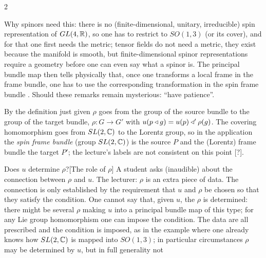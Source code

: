 \begin{paracol}{2}
\begin{application}
Why spinors need this: there is no (finite-dimensional, unitary, irreducible) spin representation of $GL(4,\mathbb{R})$, so one has to restrict to $SO(1,3)$ (or its cover), and for that one first needs the metric; tensor fields do not need a metric, they exist because the manifold is smooth, but finite-dimensional spinor representations require a geometry before one can even say what a spinor is. The principal bundle map then tells physically that, once one transforms a local frame in the frame bundle, one has to use the corresponding transformation in the spin frame bundle     . Should these remarks remain mysterious: ``have patience''.
\end{application}
\begin{coursenote}
By the definition just given $\rho$ goes from the group of the source bundle to the group of the target bundle, $\rho\colon G\to G'$ with $u(p\mathbin{\triangleleft} g)=u(p)\mathbin{\triangleleft}'\rho(g)$. The covering homomorphism goes from $SL(2,\mathbb{C})$ to the Lorentz group, so in the application the \emph{spin frame bundle} (group $SL(2,\mathbb{C})$) is the source $P$ and the (Lorentz) frame bundle the target $P'$; the lecture's labels are not consistent on this point [?]. 
\end{coursenote}
\begin{answer}{Does $u$ determine $\rho$?}[The role of $\rho$]
A student asks (inaudible) about the connection between $\rho$ and $u$. The lecturer: $\rho$ is an extra piece of data. The connection is only established by the requirement that $u$ and $\rho$ be chosen so that they satisfy the condition. One cannot say that, given $u$, the $\rho$ is determined: there might be several $\rho$ making $u$ into a principal bundle map of this type; for any Lie group homomorphism one can impose the condition. The data are all prescribed and the condition is imposed, as in the example where one already knows how $SL(2,\mathbb{C})$ is mapped into $SO(1,3)$; in particular circumstances $\rho$ may be determined by $u$, but in full generality not      
\end{answer}


\end{paracol}
